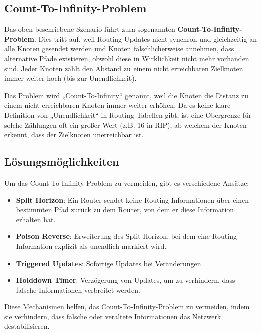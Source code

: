 \documentclass[a4paper]{scrartcl}
\begin{document}
\subsection*{Count-To-Infinity-Problem}

Das oben beschriebene Szenario führt zum sogenannten \textbf{Count-To-Infinity-Problem}. Dies tritt auf, weil Routing-Updates nicht synchron und gleichzeitig an alle Knoten gesendet werden und Knoten fälschlicherweise annehmen, dass alternative Pfade existieren, obwohl diese in Wirklichkeit nicht mehr vorhanden sind. Jeder Knoten zählt den Abstand zu einem nicht erreichbaren Zielknoten immer weiter hoch (bis zur Unendlichkeit).

Das Problem wird „Count-To-Infinity“ genannt, weil die Knoten die Distanz zu einem nicht erreichbaren Knoten immer weiter erhöhen. Da es keine klare Definition von „Unendlichkeit“ in Routing-Tabellen gibt, ist eine Obergrenze für solche Zählungen oft ein großer Wert (z.B. 16 in RIP), ab welchem der Knoten erkennt, dass der Zielknoten unerreichbar ist.

\subsection*{Lösungsmöglichkeiten}

Um das Count-To-Infinity-Problem zu vermeiden, gibt es verschiedene Ansätze:
\begin{itemize}
    \item \textbf{Split Horizon}: Ein Router sendet keine Routing-Informationen über einen bestimmten Pfad zurück zu dem Router, von dem er diese Information erhalten hat.
    \item \textbf{Poison Reverse}: Erweiterung des Split Horizon, bei dem eine Routing-Information explizit als unendlich markiert wird.
    \item \textbf{Triggered Updates}: Sofortige Updates bei Veränderungen.
    \item \textbf{Holddown Timer}: Verzögerung von Updates, um zu verhindern, dass falsche Informationen verbreitet werden.
\end{itemize}

Diese Mechanismen helfen, das Count-To-Infinity-Problem zu vermeiden, indem sie verhindern, dass falsche oder veraltete Informationen das Netzwerk destabilisieren.
\end{document}
